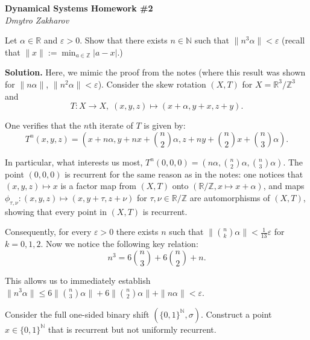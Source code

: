 \documentclass{template}
\begin{document}
\begin{center}
    \Large \textcolor{blue!70!black}{\textbf{Dynamical Systems Homework \#2}} \\
    \normalsize \textit{Dmytro Zakharov}
\end{center}

\begin{problem}[Exercise 1]
    Let $\alpha \in \mathbb{R}$ and $\varepsilon>0$. Show that there exists 
    $n \in \mathbb{N}$ such that $\|n^3\alpha\|<\varepsilon$ (recall that 
    $\|x\| := \min_{a \in \mathbb{Z}}|a-x|$.)
\end{problem}

\textbf{Solution.} Here, we mimic the proof from the notes (where this result
was shown for $\|n\alpha\|$, $\|n^2\alpha\|<\varepsilon$). Consider the skew
rotation $(X,T)$ for $X=\mathbb{R}^3/\mathbb{Z}^3$ and 
\begin{equation*}
    T: X \to X, \; (x,y,z) \mapsto (x+\alpha, y+x, z+y).
\end{equation*}

One verifies that the $n$th iterate of $T$ is given by:
\begin{equation*}
    T^n(x,y,z) = \left( x+n\alpha, y+nx+\binom{n}{2}\alpha, z+ny+\binom{n}{2}x+\binom{n}{3}\alpha \right).
\end{equation*}

In particular, what interests us most, $T^n(0,0,0) = (n\alpha,
\binom{n}{2}\alpha, \binom{n}{3}\alpha)$. The point $(0,0,0)$ is recurrent for
the same reason as in the notes: one notices that $(x,y,z) \mapsto x$ is a
factor map from $(X,T)$ onto $(\mathbb{R}/\mathbb{Z}, x \mapsto x+\alpha)$, 
and maps $\phi_{\tau,\nu}: (x,y,z) \mapsto (x,y+\tau,z+\nu)$ for $\tau,\nu \in \mathbb{R}/\mathbb{Z}$
are automorphisms of $(X,T)$, showing that every point in $(X,T)$ is recurrent.

Consequently, for every $\varepsilon>0$ there exists $n$ such that $\|\binom{n}{k}\alpha\| < \frac{1}{13}\varepsilon$
for $k=0,1,2$. Now we notice the following key relation:
\begin{equation*}
    n^3 = 6\binom{n}{3} + 6\binom{n}{2} + n.
\end{equation*}

This allows us to immediately establish $\|n^3\alpha\| \leq 6\|\binom{n}{3}\alpha\| + 6\|\binom{n}{2}\alpha\| + \|n\alpha\| < \varepsilon$.

\begin{problem}[Exercise 2]
    Consider the full one-sided binary shift $(\{0,1\}^{\mathbb{N}},\sigma)$.
    Construct a point $x \in \{0,1\}^{\mathbb{N}}$ that is recurrent but not 
    uniformly recurrent. 
\end{problem}
\end{document}
